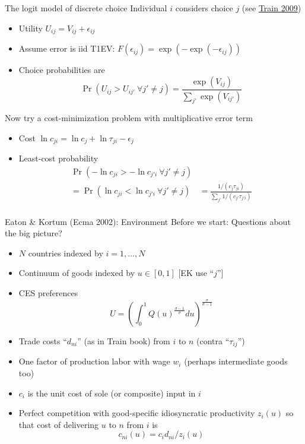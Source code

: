 \documentclass[11pt,notes=hide,aspectratio=169]{beamer}
\begin{document}
\begin{frame}{The logit model of discrete choice}
Individual $i$ considers choice $j$ (see \href{https://eml.berkeley.edu/books/choice2.html}{Train 2009})
\begin{itemize}
	\item Utility $U_{ij} = V_{ij} + \epsilon_{ij}$
	\item Assume error is iid T1EV: $F\left(\epsilon_{ij}\right)=\exp(-\exp(-\epsilon_{ij}))$
	\item Choice probabilities are
	\begin{equation*}\Pr(U_{ij}>U_{ij'} \ \forall j' \neq j) = \frac{\exp(V_{ij})}{\sum_{j'}\exp(V_{ij'})} \end{equation*}
\end{itemize}
Now try a cost-minimization problem with multiplicative error term
\begin{itemize}
	\item Cost $\ln c_{ji} = \ln c_j + \ln \tau_{ji} - \epsilon_{j}$
	\item Least-cost probability
	\begin{align*}
	\Pr(-\ln c_{ji}> -\ln c_{j'i} \ \forall j' \neq j) \\
	= \Pr(\ln c_{ji}<\ln c_{j'i} \ \forall j' \neq j) 
	& 
	= \frac{1/(c_j\tau_{ji})}{\sum_{j'}1/(c_{j'}\tau_{j'i})} \\
	\end{align*}
\end{itemize}
\end{frame}
\begin{frame}{Eaton \& Kortum (Ecma 2002): Environment}
Before we start: Questions about the big picture?
\begin{itemize}
	\item $N$ countries indexed by $i=1,\dots,N$
	\item Continuum of goods indexed by $u \in [0,1]$ [EK use ``$j$'']
	\item CES preferences
	\begin{equation*}
	U=\left( \int_{0}^{1}Q(u) ^{\frac{\sigma -1}{\sigma }}du\right)
	^{\frac{\sigma }{\sigma -1}}
	\end{equation*}
	\item Trade costs ``$d_{ni}$'' (as in Train book) from $i$ to $n$ (contra ``$\tau_{ij}$'')
	\item One factor of production labor with wage $w_i$ (perhaps intermediate goods too)
	\item $c_i$ is the unit cost of sole (or composite) input in $i$
	\item Perfect competition with good-specific idiosyncratic productivity $z_i(u)$ so that cost of delivering $u$ to $n$ from $i$ is 
	\begin{equation*}c_{ni}(u) = c_i d_{ni} / z_i(u)\end{equation*}
\end{itemize}
\end{frame}
\end{document}
